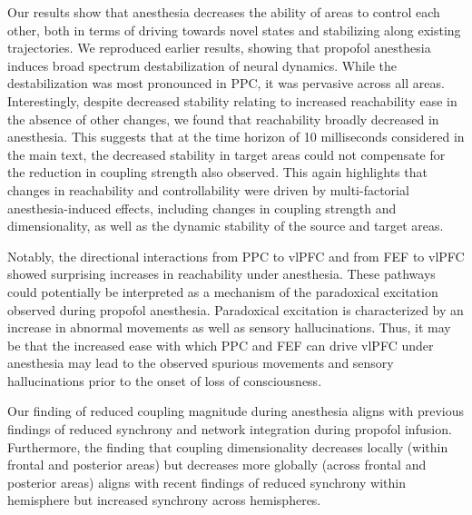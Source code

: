 Our results show that anesthesia decreases the ability of areas to control each other, both in terms of driving towards novel states and stabilizing along existing trajectories. We reproduced earlier results, showing that propofol anesthesia induces broad spectrum destabilization of neural dynamics. While the destabilization was most pronounced in PPC, it was pervasive across all areas. Interestingly, despite decreased stability relating to increased reachability ease in the absence of other changes, we found that reachability broadly decreased in anesthesia. This suggests that at the time horizon of 10 milliseconds considered in the main text, the decreased stability in target areas could not compensate for the reduction in coupling strength also observed. This again highlights that changes in reachability and controllability were driven by multi-factorial anesthesia-induced effects, including changes in coupling strength and dimensionality, as well as the dynamic stability of the source and target areas.

 Notably, the directional interactions from PPC to vlPFC and from FEF to vlPFC showed surprising increases in reachability under anesthesia. These pathways could potentially be interpreted as a mechanism of the paradoxical excitation observed during propofol anesthesia. Paradoxical excitation is characterized by an increase in abnormal movements as well as sensory hallucinations.\cite{Jeong2011-mr, McCarthy2008-pe, Sneyd1992-ku} Thus, it may be that the increased ease with which PPC and FEF can drive vlPFC under anesthesia may lead to the observed spurious movements and sensory hallucinations prior to the onset of loss of consciousness.

 Our finding of reduced coupling magnitude during anesthesia aligns with previous findings of reduced synchrony and network integration during propofol infusion.\cite{Lewis2012-bs, Bardon2025-zi, Li2026-nh, Huang2024-px, Liang2025-li, Wilsenach2025-zy, Castro2024-dr, Luppi2025-oa, Luppi2024-yl, Alkire2008-zy, Boveroux2010-pn, Demertzi2019-gz, Song2015-lm, Lee2018-su, Malekmohammadi2018-oa, Ensel2024-cg, Tauber2023-sp, Franks2008-ej} Furthermore, the finding that coupling dimensionality decreases locally (within frontal and posterior areas) but decreases more globally (across frontal and posterior areas) aligns with recent findings of reduced synchrony within hemisphere but increased synchrony across hemispheres.\cite{Bardon2025-zi}

